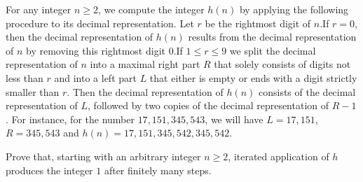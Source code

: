 For any integer $n\geq 2$,  we compute the integer $h(n)$ by applying the following procedure to its decimal representation. Let $r$ be the rightmost digit of $n$.If $r=0$,  then the decimal representation of $h(n)$ results from the decimal representation of $n$ by removing this rightmost digit $0$.If $1\leq r \leq 9$ we split the decimal representation of $n$ into a maximal right part $R$ that solely consists of digits not less than $r$ and into a left part $L$ that either is empty or ends with a digit strictly smaller than $r$. Then the decimal representation of $h(n)$ consists of the decimal representation of $L$,  followed by two copies of the decimal representation of $R-1$. For instance, for the number $17,151,345,543$,  we will have $L=17,151$,  $R=345,543$ and $h(n)=17,151,345,542,345,542$.

Prove that, starting with an arbitrary integer $n\geq 2$,  iterated application of $h$ produces the integer $1$ after finitely many steps.